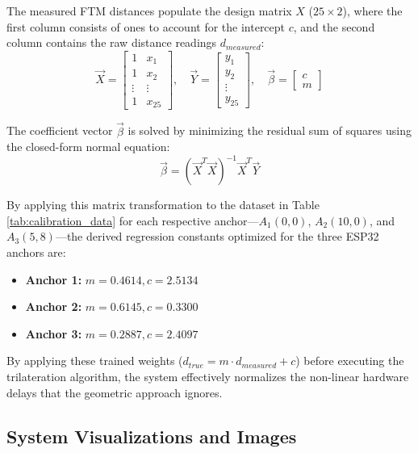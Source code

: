 \documentclass[conference]{IEEEtran}
\begin{document}
The measured FTM distances populate the design matrix $X$ ($25 \times 2$), where the first column consists of ones to account for the intercept $c$, and the second column contains the raw distance readings $d_{measured}$:
$$\vec{X} = \begin{bmatrix} 1 & x_1 \\ 1 & x_2 \\ \vdots & \vdots \\ 1 & x_{25} \end{bmatrix}, \quad \vec{Y}= \begin{bmatrix} y_1 \\ y_2 \\ \vdots \\ y_{25} \end{bmatrix}, \quad \vec{\beta} = \begin{bmatrix} c \\ m \end{bmatrix}$$

The coefficient vector $\vec{\beta}$ is solved by minimizing the residual sum of squares using the closed-form normal equation:
$$\vec{\beta}= (\vec{X}^T \vec{X})^{-1} \vec{X}^T \vec{Y}$$

By applying this matrix transformation to the dataset in Table \ref{tab:calibration_data} for each respective anchor---$A_1(0,0)$, $A_2(10,0)$, and $A_3(5,8)$---the derived regression constants optimized for the three ESP32 anchors are:
\begin{itemize}
    \item \textbf{Anchor 1:} $m = 0.4614, c = 2.5134$
    \item \textbf{Anchor 2:} $m = 0.6145, c = 0.3300$
    \item \textbf{Anchor 3:} $m = 0.2887, c = 2.4097$
\end{itemize}
By applying these trained weights ($d_{true} = m \cdot d_{measured} + c$) before executing the trilateration algorithm, the system effectively normalizes the non-linear hardware delays that the geometric approach ignores.

\subsection{System Visualizations and Images}
\end{document}
